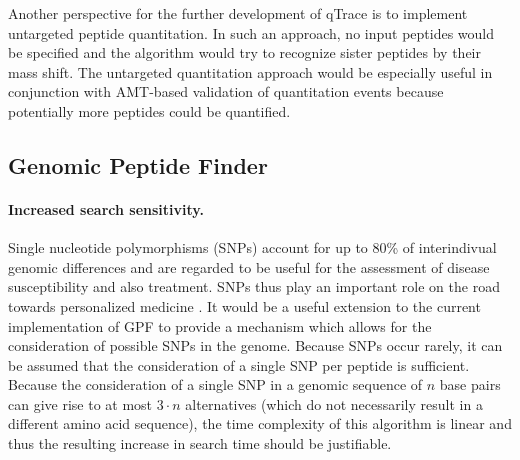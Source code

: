 Another perspective for the further development of qTrace is to implement
untargeted peptide quantitation. 
In such an approach, no input peptides would be specified and the algorithm
would try to recognize sister peptides by their mass shift.
The untargeted quantitation approach would be especially useful in conjunction
with AMT-based validation of quantitation events because potentially more 
peptides could be quantified.

\subsection{Genomic Peptide Finder}

\paragraph{Increased search sensitivity.}

Single nucleotide polymorphisms (SNPs) account for up to 80\% of interindivual
genomic differences and are regarded to be useful for the assessment of disease
susceptibility and also treatment.
SNPs thus play an important role on the road towards personalized medicine 
\citep{Carlson2008}.
It would be a useful extension to the current implementation of GPF to provide 
a mechanism which allows for the consideration of possible SNPs in the genome.
Because SNPs occur rarely, it can be assumed that the consideration of a single
SNP per peptide is sufficient.
Because the consideration of a single SNP in a genomic sequence of $n$ base pairs
can give rise to at most $3 \cdot n$ alternatives (which do not necessarily
result in a different amino acid sequence), the time complexity of this algorithm
is linear and thus the resulting increase in search time should be justifiable.

